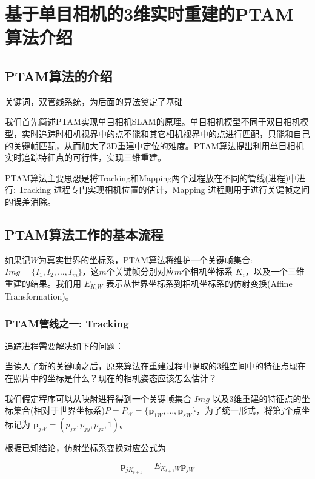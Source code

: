 
\def \R2{\mathbb{R}^2}
\def \R3{\mathbb{R}^3}
\def \Rn{\mathbb{R}^n}

\def \itW{\mathit{W}}

\def \itK{\mathit{K}}
\def \bfp{\mathbf{p}}

\chapter{基于单目相机的3维实时重建的PTAM算法介绍}


\section{PTAM算法的介绍}
关键词，双管线系统，为后面的算法奠定了基础

我们首先简述PTAM实现单目相机SLAM的原理。单目相机模型不同于双目相机模型，实时追踪时相机视界中的点不能和其它相机视界中的点进行匹配，只能和自己的关键帧匹配，从而加大了3D重建中定位的难度。PTAM算法提出利用单目相机实时追踪特征点的可行性，实现三维重建。

PTAM算法主要思想是将Tracking和Mapping两个过程放在不同的管线(进程)中进行: Tracking 进程专门实现相机位置的估计，Mapping 进程则用于进行关键帧之间的误差消除。

\section{PTAM算法工作的基本流程}
如果记$\itW$为真实世界的坐标系，PTAM算法将维护一个关键帧集合: $Img=\{I_1,I_2,\ldots,I_m\}$，这\(m\)个关键帧分别对应\(m\)个相机坐标系 $\itK_i$，以及一个三维重建的结果。我们用 $E_{\itK_i\itW}$ 表示从世界坐标系到相机坐标系的仿射变换(Affine Transformation)。

\subsection{PTAM管线之一: Tracking}

%
%
追踪进程需要解决如下的问题：

当读入了新的关键帧之后，原来算法在重建过程中提取的3维空间中的特征点现在在照片中的坐标是什么？现在的相机姿态应该怎么估计？ 

我们假定程序可以从映射进程得到一个关键帧集合 $Img$ 以及3维重建的特征点的坐标集合(相对于世界坐标系)$P=P_\itW=\{\bfp_{1\itW},\ldots,\bfp_{s\itW}\}$，为了统一形式，将第$j$个点坐标记为 $\bfp_{j\itW}= (p_{jx},p_{jy},p_{jz},1)$。

根据已知结论，仿射坐标系变换对应公式为

\begin{equation}
\bfp_{jK_{t+1}}= E_{K_{t+1}\itW} \bfp_{j\itW}
\end{equation}


